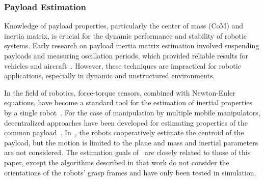 \subsubsection{Payload Estimation}
Knowledge of payload properties, particularly the center of mass (CoM) and inertia matrix, is crucial for the dynamic performance and stability of robotic systems. Early research on payload inertia matrix estimation involved suspending payloads and measuring oscillation periods, which provided reliable results for vehicles and aircraft~\cite{miller1930accurate, woodfield1968measurement, winkler1983inertial, winkler1983parametric, heydinger1995design}. However, these techniques are impractical for robotic applications, especially in dynamic and unstructured environments.

In the field of robotics, force-torque sensors, combined with Newton-Euler equations, have become a standard tool for the estimation of inertial properties by a single robot~\cite{atkeson1986estimation}. For the case of manipulation by multiple mobile manipulators, decentralized approaches have been developed for estimating properties of the common payload~\cite{habibi2015distributed,marino2018}. %
In~\cite{habibi2015distributed}, the robots cooperatively estimate the centroid of the payload, but the motion is limited to the plane and mass and inertial parameters are not considered. The estimation goals of~\cite{marino2018} are closely related to those of this paper, except the algorithms described in that work do not consider the orientations of the robots' grasp frames and have only been tested in simulation.




